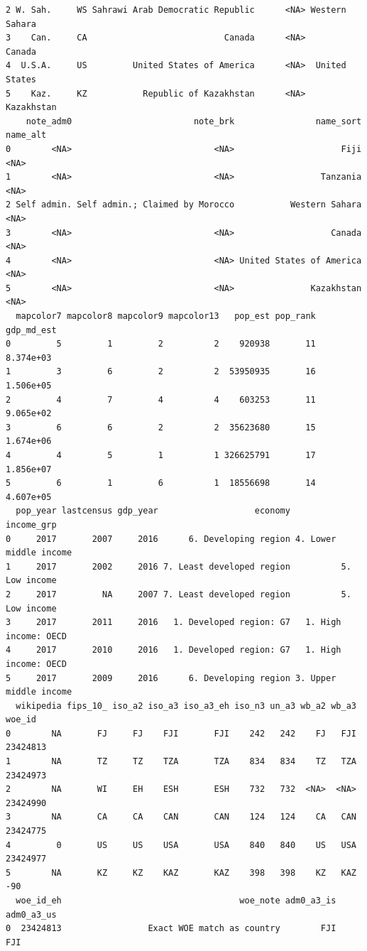 \documentclass[
]{article}
\begin{document}
\begin{verbatim}
2 W. Sah.     WS Sahrawi Arab Democratic Republic      <NA> Western Sahara
3    Can.     CA                           Canada      <NA>         Canada
4  U.S.A.     US         United States of America      <NA>  United States
5    Kaz.     KZ           Republic of Kazakhstan      <NA>     Kazakhstan
    note_adm0                        note_brk                name_sort name_alt
0        <NA>                            <NA>                     Fiji     <NA>
1        <NA>                            <NA>                 Tanzania     <NA>
2 Self admin. Self admin.; Claimed by Morocco           Western Sahara     <NA>
3        <NA>                            <NA>                   Canada     <NA>
4        <NA>                            <NA> United States of America     <NA>
5        <NA>                            <NA>               Kazakhstan     <NA>
  mapcolor7 mapcolor8 mapcolor9 mapcolor13   pop_est pop_rank gdp_md_est
0         5         1         2          2    920938       11  8.374e+03
1         3         6         2          2  53950935       16  1.506e+05
2         4         7         4          4    603253       11  9.065e+02
3         6         6         2          2  35623680       15  1.674e+06
4         4         5         1          1 326625791       17  1.856e+07
5         6         1         6          1  18556698       14  4.607e+05
  pop_year lastcensus gdp_year                   economy             income_grp
0     2017       2007     2016      6. Developing region 4. Lower middle income
1     2017       2002     2016 7. Least developed region          5. Low income
2     2017         NA     2007 7. Least developed region          5. Low income
3     2017       2011     2016   1. Developed region: G7   1. High income: OECD
4     2017       2010     2016   1. Developed region: G7   1. High income: OECD
5     2017       2009     2016      6. Developing region 3. Upper middle income
  wikipedia fips_10_ iso_a2 iso_a3 iso_a3_eh iso_n3 un_a3 wb_a2 wb_a3   woe_id
0        NA       FJ     FJ    FJI       FJI    242   242    FJ   FJI 23424813
1        NA       TZ     TZ    TZA       TZA    834   834    TZ   TZA 23424973
2        NA       WI     EH    ESH       ESH    732   732  <NA>  <NA> 23424990
3        NA       CA     CA    CAN       CAN    124   124    CA   CAN 23424775
4         0       US     US    USA       USA    840   840    US   USA 23424977
5        NA       KZ     KZ    KAZ       KAZ    398   398    KZ   KAZ      -90
  woe_id_eh                                   woe_note adm0_a3_is adm0_a3_us
0  23424813                 Exact WOE match as country        FJI        FJI

\end{verbatim}
\end{document}
